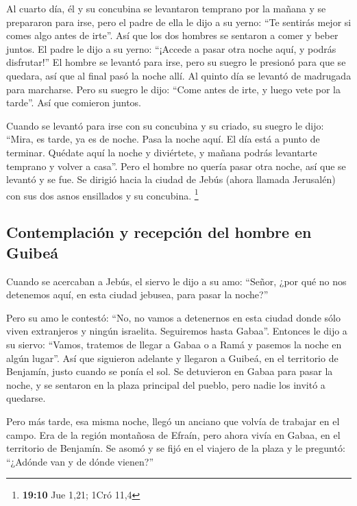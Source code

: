  Al cuarto día, él y su concubina se levantaron temprano
por la mañana y se prepararon para irse, pero el padre de ella le dijo a
su yerno: ``Te sentirás mejor si comes algo antes de irte''.
 Así que los dos hombres se sentaron a comer y beber
juntos. El padre le dijo a su yerno: ``¡Accede a pasar otra noche aquí,
y podrás disfrutar!''  El hombre se levantó para irse,
pero su suegro le presionó para que se quedara, así que al final pasó la
noche allí.  Al quinto día se levantó de madrugada para
marcharse. Pero su suegro le dijo: ``Come antes de irte, y luego vete
por la tarde''. Así que comieron juntos.

 Cuando se levantó para irse con su concubina y su criado,
su suegro le dijo: ``Mira, es tarde, ya es de noche. Pasa la noche aquí.
El día está a punto de terminar. Quédate aquí la noche y diviértete, y
mañana podrás levantarte temprano y volver a casa''. 
Pero el hombre no quería pasar otra noche, así que se levantó y se fue.
Se dirigió hacia la ciudad de Jebús (ahora llamada Jerusalén) con sus
dos asnos ensillados y su concubina. \footnote{\textbf{19:10} Jue 1,21;
  1Cró 11,4}

\hypertarget{contemplaciuxf3n-y-recepciuxf3n-del-hombre-en-guibeuxe1}{%
\subsection{Contemplación y recepción del hombre en
Guibeá}\label{contemplaciuxf3n-y-recepciuxf3n-del-hombre-en-guibeuxe1}}

 Cuando se acercaban a Jebús, el siervo le dijo a su amo:
``Señor, ¿por qué no nos detenemos aquí, en esta ciudad jebusea, para
pasar la noche?''

 Pero su amo le contestó: ``No, no vamos a detenernos en
esta ciudad donde sólo viven extranjeros y ningún israelita. Seguiremos
hasta Gabaa''.  Entonces le dijo a su siervo: ``Vamos,
tratemos de llegar a Gabaa o a Ramá y pasemos la noche en algún lugar''.
 Así que siguieron adelante y llegaron a Guibeá, en el
territorio de Benjamín, justo cuando se ponía el sol.  Se
detuvieron en Gabaa para pasar la noche, y se sentaron en la plaza
principal del pueblo, pero nadie los invitó a quedarse.

 Pero más tarde, esa misma noche, llegó un anciano que
volvía de trabajar en el campo. Era de la región montañosa de Efraín,
pero ahora vivía en Gabaa, en el territorio de Benjamín. 
Se asomó y se fijó en el viajero de la plaza y le preguntó: ``¿Adónde
van y de dónde vienen?''

